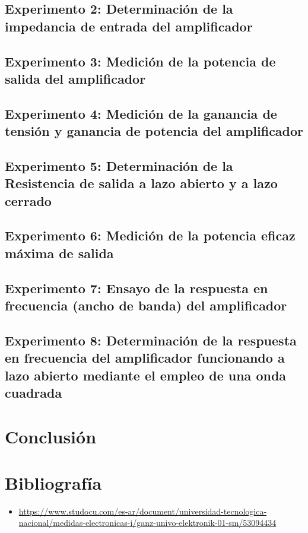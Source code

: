 \vspace{1.5cm}
\subsection{Experimento 2: Determinación de la impedancia de entrada del amplificador}


\newpage
\subsection{Experimento 3: Medición de la potencia de salida del amplificador}


\newpage
\subsection{Experimento 4: Medición de la ganancia de tensión y ganancia de potencia del amplificador}


\newpage
\subsection{Experimento 5: Determinación de la Resistencia de salida a lazo abierto y a lazo cerrado}


\vspace{1.5cm}
\subsection{Experimento 6: Medición de la potencia eficaz máxima de salida}


\newpage
\subsection{Experimento 7: Ensayo de la respuesta en frecuencia (ancho de banda) del amplificador}


\newpage
\subsection{Experimento 8: Determinación de la respuesta en frecuencia del amplificador funcionando a lazo abierto mediante el empleo de una onda cuadrada}


\newpage
\section{Conclusión}




\vspace{1cm}
\section{Bibliografía}
\begin{itemize}
    \item \url{https://www.studocu.com/es-ar/document/universidad-tecnologica-nacional/medidas-electronicas-i/ganz-univo-elektronik-01-sm/53094434}
\end{itemize}

\newpage


